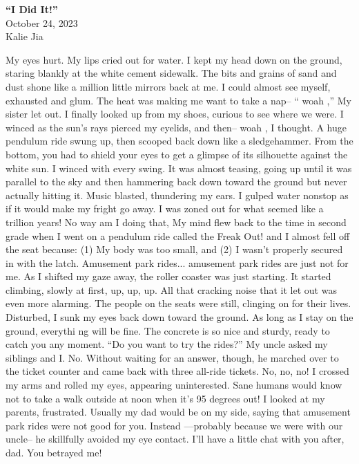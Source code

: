 \documentclass[12pt]{article}
\begin{document}
\begin{center}
\textbf{``I Did It!''} \\
October 24, 2023 \\
Kalie Jia
\end{center}

My eyes hurt. My lips cried out for water. I kept my head down on the ground, staring  blankly at the white cement sidewalk. The bits and grains of sand and dust shone like a million  little mirrors back at me. I could almost see myself, exhausted and glum. The heat was making  me want to take a nap– “  woah  ,” My sister let out.  I finally looked up from my shoes, curious to see where we were. I winced as the sun’s  rays pierced my eyelids, and then–  woah  , I thought.  A huge pendulum ride swung up, then scooped back down like a sledgehammer. From the  bottom, you had to shield your eyes to get a glimpse of its silhouette against the white sun. I  winced with every swing. It was almost teasing, going up until it was parallel to the sky and then  hammering back down toward the ground but never actually hitting it. Music blasted, thundering  my ears.  I gulped water nonstop as if it would make my fright go away. I was zoned out for what  seemed like a trillion years! 
 No way am I doing that,  My mind flew back to the time  in second grade when I went on a  pendulum ride called the  Freak Out!  and I almost fell  off the seat because: (1) My body was too  small, and (2) I wasn’t properly secured in with the latch.  Amusement park rides... amusement  park rides are just not for me. 
 As I shifted my gaze away, the roller coaster was just starting. It started climbing, slowly  at first, up, up, up. All that cracking noise that it let out was even more alarming. The people on  the seats were still, clinging on for their lives. Disturbed, I sunk my eyes back down toward the 
 ground.  As long as I stay on the ground, everythi  ng will be fine. The concrete is so nice and  sturdy, ready to catch you any moment. 
 “Do you want to try the rides?” My uncle asked my siblings and I. 
 No. 
 Without waiting for an answer, though, he marched over to the ticket counter and came  back with three all-ride tickets. 
 No, no, no! 
 I crossed my arms and rolled my eyes, appearing uninterested.  Sane humans would know  not to take a walk outside at noon when it’s 95 degrees out! 
 I looked at my parents, frustrated. Usually my dad would be on my side, saying that  amusement park rides were not good for you. Instead —probably because we were with our  uncle–  he skillfully avoided my eye contact.  I’ll  have a little chat with you after, dad. You  betrayed me! 
\end{document}

